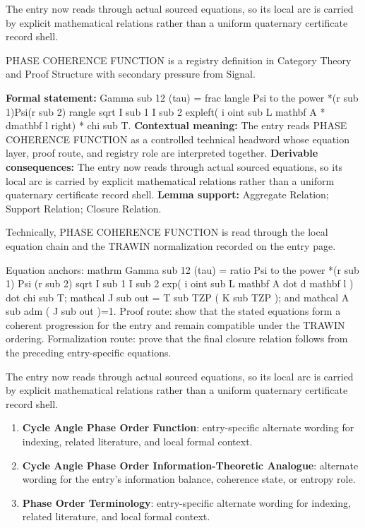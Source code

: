 The entry now reads through actual sourced equations, so its local arc is carried by explicit mathematical relations rather than a uniform quaternary certificate record shell.
\clearpage


\begingroup\small
{}
PHASE COHERENCE FUNCTION is a registry definition in Category Theory and Proof Structure with secondary pressure from Signal.

\begingroup\footnotesize\setlength{\emergencystretch}{3em}\sloppy
\textbf{Formal statement:} Gamma sub 12 (tau) = frac langle Psi to the power *(r sub 1)Psi(r sub 2) rangle sqrt I sub 1 I sub 2 expleft( i oint sub L mathbf A * dmathbf l right) * chi sub T. \textbf{Contextual meaning:} The entry reads PHASE COHERENCE FUNCTION as a controlled technical headword whose equation layer, proof route, and registry role are interpreted together. \textbf{Derivable consequences:} The entry now reads through actual sourced equations, so its local arc is carried by explicit mathematical relations rather than a uniform quaternary certificate record shell. \textbf{Lemma support:} Aggregate Relation; Support Relation; Closure Relation.\par
\endgroup

Technically, PHASE COHERENCE FUNCTION is read through the local equation chain and the TRAWIN normalization recorded on the entry page.

Equation anchors: mathrm Gamma sub 12 (tau) = ratio Psi to the power *(r sub 1) Psi (r sub 2) sqrt I sub 1 I sub 2 exp( i oint sub L mathbf A dot d mathbf l ) dot chi sub T; mathcal J sub out = T sub TZP ( K sub TZP ); and mathcal A sub adm ( J sub out )=1. Proof route: show that the stated equations form a coherent progression for the entry and remain compatible under the TRAWIN ordering. Formalization route: prove that the final closure relation follows from the preceding entry-specific equations.

The entry now reads through actual sourced equations, so its local arc is carried by explicit mathematical relations rather than a uniform quaternary certificate record shell.
\endgroup

\begin{enumerate}[leftmargin=1.6em,itemsep=6pt,topsep=4pt]
\item \textbf{Cycle Angle Phase Order Function}: entry-specific alternate wording for indexing, related literature, and local formal context.
\item \textbf{Cycle Angle Phase Order Information-Theoretic Analogue}: alternate wording for the entry's information balance, coherence state, or entropy role.
\item \textbf{Phase Order Terminology}: entry-specific alternate wording for indexing, related literature, and local formal context.
\end{enumerate}


